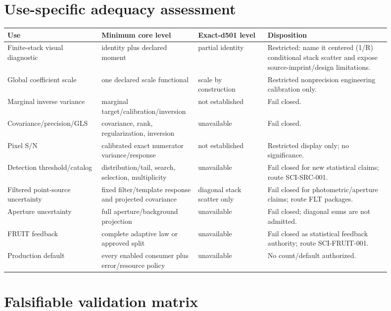 \documentclass[11pt]{article}
\begin{document}
\section{Use-specific adequacy assessment}

\begin{longtable}{L{0.23\linewidth}L{0.20\linewidth}L{0.17\linewidth}L{0.30\linewidth}}
\toprule
Use & Minimum core level & Exact-d501 level & Disposition\\
\midrule
Finite-stack visual diagnostic & identity plus declared moment & partial identity &
Restricted: name it centered (1/R) conditional stack scatter and expose
source-imprint/design limitations.\\
Global coefficient scale & one declared scale functional & scale by construction &
Restricted nonprecision engineering calibration only.\\
Marginal inverse variance & marginal target/calibration/inversion & not established &
Fail closed.\\
Covariance/precision/GLS & covariance, rank, regularization, inversion & unavailable &
Fail closed.\\
Pixel S/N & calibrated exact numerator variance/response & not established &
Restricted display only; no significance.\\
Detection threshold/catalog & distribution/tail, search, selection, multiplicity & unavailable &
Fail closed for new statistical claims; route SCI-SRC-001.\\
Filtered point-source uncertainty & fixed filter/template response and projected covariance &
diagonal stack scatter only &
Fail closed for photometric/aperture claims; route FLT packages.\\
Aperture uncertainty & full aperture/background projection & unavailable &
Fail closed; diagonal sums are not admitted.\\
FRUIT feedback & complete adaptive law or approved split & unavailable &
Fail closed as statistical feedback authority; route SCI-FRUIT-001.\\
Production default & every enabled consumer plus error/resource policy & unavailable &
No count/default authorized.\\
\bottomrule
\end{longtable}

\section{Falsifiable validation matrix}
\end{document}
